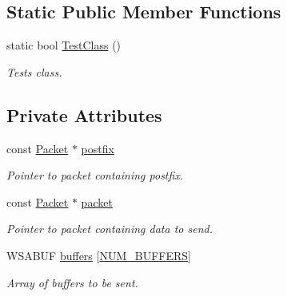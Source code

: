 \subsection*{Static Public Member Functions}
\begin{DoxyCompactItemize}
\item 
static bool \hyperlink{class_net_send_postfix_ab2b63c00d16b830341d94a82a07c60f9}{TestClass} ()
\begin{DoxyCompactList}\small\item\em Tests class. \item\end{DoxyCompactList}\end{DoxyCompactItemize}
\subsection*{Private Attributes}
\begin{DoxyCompactItemize}
\item 
\hypertarget{class_net_send_postfix_a7ac54a6f1a83c952ace599d72ca9f4ca}{
const \hyperlink{class_packet}{Packet} $\ast$ \hyperlink{class_net_send_postfix_a7ac54a6f1a83c952ace599d72ca9f4ca}{postfix}}
\label{class_net_send_postfix_a7ac54a6f1a83c952ace599d72ca9f4ca}

\begin{DoxyCompactList}\small\item\em Pointer to packet containing postfix. \item\end{DoxyCompactList}\item 
\hypertarget{class_net_send_postfix_a2b2681bf0bf3dce55574c1b6f2414c5e}{
const \hyperlink{class_packet}{Packet} $\ast$ \hyperlink{class_net_send_postfix_a2b2681bf0bf3dce55574c1b6f2414c5e}{packet}}
\label{class_net_send_postfix_a2b2681bf0bf3dce55574c1b6f2414c5e}

\begin{DoxyCompactList}\small\item\em Pointer to packet containing data to send. \item\end{DoxyCompactList}\item 
WSABUF \hyperlink{class_net_send_postfix_a36aafafb7f8795742b03165f4398bf7d}{buffers} \mbox{[}\hyperlink{class_net_send_postfix_a9d47008c9acdc780eb5ff1f3b72dcc5a}{NUM\_\-BUFFERS}\mbox{]}
\begin{DoxyCompactList}\small\item\em Array of buffers to be sent. \item\end{DoxyCompactList}\end{DoxyCompactItemize}
